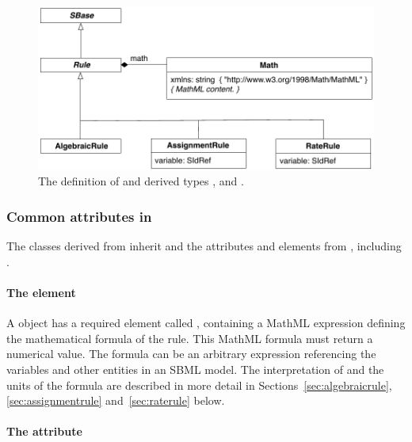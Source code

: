 \begin{figure}[htb]
  \centering
  \vspace*{4ex}
  \includegraphics[scale=0.8]{figs/rule-uml}
  \caption{The definition of \Rule and derived types
      \AlgebraicRule, \AssignmentRule and \RateRule.}
  \label{fig:rules}
\vspace*{3ex}
\end{figure}



\subsubsection{Common attributes in }
\label{sec:rule-math}\label{sec:rule-fields}\label{sec:rule-sboterm}

The classes derived from \Rule inherit  and
  the attributes and elements from \SBase, including
.


\paragraph{The  element}

A \Rule object has a required element called ,
containing a MathML expression defining the mathematical formula
of the rule.  This MathML formula must return a numerical value.
The formula can be an arbitrary expression referencing the
variables and other entities in an SBML model.  The interpretation
of  and the units of the formula are described in more
detail in Sections~\ref{sec:algebraicrule},
\ref{sec:assignmentrule} and~\ref{sec:raterule} below.


\paragraph{The  attribute}

